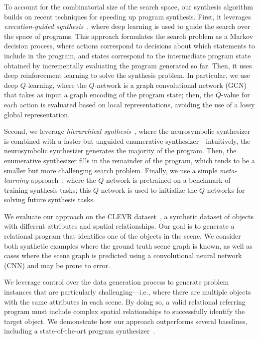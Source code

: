 To account for the combinatorial size of the search space, our synthesis algorithm builds on recent techniques for speeding up program synthesis. First, it leverages \emph{execution-guided synthesis}~\cite{chen2018execution}, where deep learning is used to guide the search over the space of programs. This approach formulates the search problem as a Markov decision process, where actions correspond to decisions about which statements to include in the program, and states correspond to the intermediate program state obtained by incrementally evaluating the program generated so far. Then, it uses deep reinforcement learning to solve the synthesis problem. In particular, we use deep $Q$-learning, where the $Q$-network is a graph convolutional network (GCN) that takes as input a graph encoding of the program state; then, the $Q$-value for each action is evaluated based on local representations, avoiding the use of a lossy global representation.

Second, we leverage \emph{hierarchical synthesis}~\citep{nye2019learning}, where the neurosymbolic synthesizer is combined with a faster but unguided enumerative synthesizer---intuitively, the neurosymbolic synthesizer generates the majority of the program. Then, the enumerative synthesizer fills in the remainder of the program, which tends to be a smaller but more challenging search problem. Finally, we use a simple \emph{meta-learning} approach~\cite{si2018learning}, where the $Q$-network is pretrained on a benchmark of training synthesis tasks; this $Q$-network is used to initialize the $Q$-networks for solving future synthesis tasks.

We evaluate our approach on the CLEVR dataset~\cite{johnson2017clevr}, a synthetic dataset of objects with different attributes and spatial relationships. Our goal is to generate a relational program that identifies one of the objects in the scene. We consider both synthetic examples where the ground truth scene graph is known, as well as cases where the scene graph is predicted using a convolutional neural network (CNN) and may be prone to error.

We leverage control over the data generation process to generate problem instances that are particularly challenging---i.e., where there are multiple objects with the same attributes in each scene. By doing so, a valid relational referring program must include
complex spatial relationships to successfully identify the target object. We demonstrate how our approach outperforms several baselines, including a state-of-the-art program synthesizer~\cite{si2018learning}.

